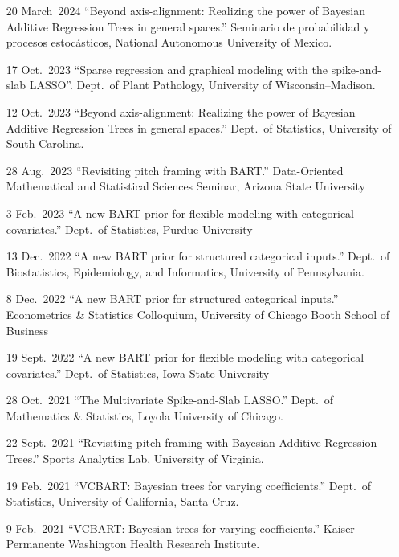 \documentclass[margin]{res}
\begin{document}
\begin{resume}
{\begin{itemize}
\item[20 March~2024]{``Beyond axis-alignment: Realizing the power of Bayesian Additive Regression Trees in general spaces.'' Seminario de probabilidad y procesos estoc\'{a}sticos, National Autonomous University of Mexico.}

\item[17 Oct.~2023]{``Sparse regression and graphical modeling with the spike-and-slab LASSO''. Dept.~of Plant Pathology, University of Wisconsin--Madison.}

\item[12 Oct.~2023]{``Beyond axis-alignment: Realizing the power of Bayesian Additive Regression Trees in general spaces.'' Dept.~of Statistics, University of South Carolina.}

\item[28 Aug.~2023]{``Revisiting pitch framing with BART.'' Data-Oriented Mathematical and Statistical Sciences Seminar, Arizona State University}

\item[3 Feb.~2023]{``A new BART prior for flexible modeling with categorical covariates.'' Dept.~of Statistics, Purdue University}

\item[13 Dec.~2022]{``A new BART prior for structured categorical inputs.'' Dept.~of Biostatistics, Epidemiology, and Informatics, University of Pennsylvania.}

\item[8 Dec.~2022]{``A new BART prior for structured categorical inputs.'' Econometrics \& Statistics Colloquium, University of Chicago Booth School of Business}

\item[19 Sept.~2022]{``A new BART prior for flexible modeling with categorical covariates.'' Dept.~of Statistics, Iowa State University}

\item[28 Oct.~2021]{``The Multivariate Spike-and-Slab LASSO.'' Dept.~of Mathematics \& Statistics, Loyola University of Chicago.}

\item[22 Sept.~2021]{``Revisiting pitch framing with Bayesian Additive Regression Trees.'' Sports Analytics Lab, University of Virginia.}

\item[19 Feb.~2021]{``VCBART: Bayesian trees for varying coefficients.'' Dept.~of Statistics, University of California, Santa Cruz.}

\item[9 Feb.~2021]{``VCBART: Bayesian trees for varying coefficients.'' Kaiser Permanente Washington Health Research Institute.}


\end{itemize}}
\end{resume}
\end{document}
